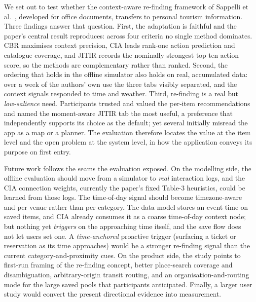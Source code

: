 \documentclass[acmlarge]{acmart}
\begin{document}
We set out to test whether the context-aware re-finding framework of
Sappelli et al.~\cite{sappelli2017}, developed for office documents,
transfers to personal tourism information. Three findings answer that
question. First, the adaptation is faithful and the paper's central result
reproduces: across four criteria no single method dominates. CBR maximises
context precision, CIA leads rank-one action prediction and catalogue
coverage, and JITIR records the nominally strongest top-ten action score,
so the methods are complementary rather than ranked.
Second, the ordering that holds in the offline simulator also holds on
real, accumulated data: over a week of the authors' own use the three tabs
visibly separated, and the context signals responded to time and weather. Third, re-finding is a real but
\emph{low-salience} need. Participants trusted and valued the per-item
recommendations and named the moment-aware JITIR tab the most useful, a
preference that independently supports its choice as the default; yet
several initially misread the app as a map or a planner. The evaluation
therefore locates the value at the item level and the open problem at the
system level, in how the application conveys its purpose on first entry.

Future work follows the seams the evaluation exposed. On the modelling side,
the offline evaluation should move from a simulator to \emph{real}
interaction logs, and the CIA connection weights, currently the paper's
fixed Table-3 heuristics, could be learned from those logs. The time-of-day
signal should become timezone-aware and per-venue rather than per-category.
The data model stores an event time on saved items, and CIA already
consumes it as a coarse time-of-day context node; but nothing yet
\emph{triggers} on the approaching time itself, and the save flow does not
let users set one. A \emph{time-anchored} proactive trigger (surfacing a
ticket or reservation as its time approaches) would be a stronger
re-finding signal than the current category-and-proximity cues. On the product side, the study
points to first-run framing of the re-finding concept, better place-search
coverage and disambiguation, arbitrary-origin transit routing, and an
organisation-and-routing mode for the large saved pools that participants
anticipated. Finally, a larger user study would convert the present
directional evidence into measurement.

\end{document}
